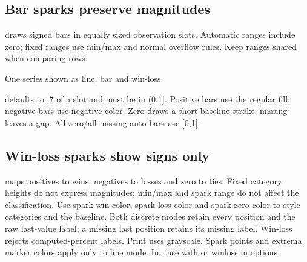 \subsection{Bar sparks preserve magnitudes}
 draws signed bars in equally sized observation slots.
Automatic ranges include zero; fixed ranges use min/max and normal overflow
rules. Keep ranges shared when comparing rows.
\begin{demo}{One series shown as line, bar and win-loss}


\end{demo}
 defaults to .7 of a slot and must be in (0,1]. Positive
bars use the regular fill; negative bars use negative color. Zero draws a short
baseline stroke; missing leaves a gap. All-zero/all-missing auto bars use [0,1].
\subsection{Win-loss sparks show signs only}
 maps positives to wins, negatives to losses and zero
to ties. Fixed category heights do not express magnitudes; min/max and spark
range do not affect the classification. Use spark win color, spark loss color
and spark zero color to style categories and the baseline.
Both discrete modes retain every position and the raw last-value label; a missing
last position retains its missing label. Win-loss rejects computed-percent labels.
Print uses grayscale. Spark points and extrema marker colors apply only to line
mode. In , use  with  or winloss in options.
